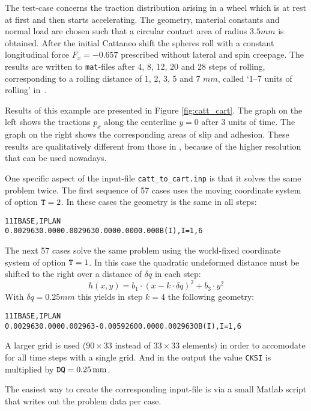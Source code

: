 \documentclass[12pt]{report}
\begin{document}
The test-case concerns the traction distribution arising in a wheel which
is at rest at first and then starts accelerating. The geometry, material
constants and normal load are chosen such that a circular contact area of
radius $3.5\unit{mm}$ is obtained. After the initial Cattaneo shift the spheres
roll with a constant longitudinal force $F_x=-0.657$ prescribed without
lateral and spin creepage. The results are written to {\tt mat}-files after
4, 8, 12, 20 and 28 steps of rolling, corresponding to a rolling distance
of 1, 2, 3, 5 and 7 $mm$, called `1--7 units of rolling' in~\cite{Kalker1990}.

Results of this example are presented in Figure \ref{fig:catt_cart}. The
graph on the left shows the tractions $p_x$ along the centerline $y=0$
after 3 units of time. The graph on the right shows the corresponding
areas of slip and adhesion. These results are qualitatively different from
those in \cite{Kalker1990}, because of the higher resolution that can be
used nowadays.

One specific aspect of the input-file {\tt catt\_to\_cart.inp} is that it
solves the same problem twice. The first sequence of 57 cases uses the
moving coordinate system of option ${\tt T}=2$. In these cases the geometry
is the same in all steps:
\begin{alltt}\small
    1   1                                                    IBASE, IPLAN
 0.002963   0.000    0.002963    0.000    0.000    0.000     B(I), I=1, 6
\end{alltt}
The next 57 cases solve the same problem using the world-fixed coordinate
system of option ${\tt T}=1$. In this case the quadratic undeformed distance
must be shifted to the right over a distance of $\delta q$ in each step:
\begin{equation}
  h(x,y) = b_1 \cdot (x-k\cdot\delta q)^2 + b_3\cdot  y^2
\end{equation}
With $\delta q=0.25\unit{mm}$ this yields in step $k=4$ the following geometry:
\begin{alltt}\small
    1   1                                                    IBASE, IPLAN
 0.002963   0.000   0.002963 -0.0059260  0.000  0.0029630    B(I), I=1, 6
\end{alltt}
A larger grid is used ($90\times 33$ instead of $33\times 33$ elements) in
order to accomodate for all time steps with a single grid. And in the
output the value {\tt CKSI} is multiplied by ${\tt DQ}=0.25\,\mathrm{mm}$.

The easiest way to create the corresponding input-file is via a small
Matlab script that writes out the problem data per case.
\end{document}
